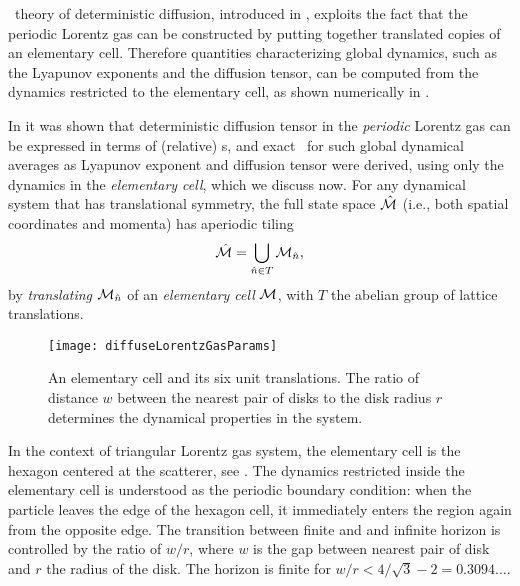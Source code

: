 

\Po\ theory of deterministic diffusion, introduced in
, exploits the fact that the periodic Lorentz
gas can be constructed by putting together translated copies of an
elementary cell. Therefore quantities characterizing global dynamics,
such as the Lyapunov exponents and the diffusion tensor, can be computed
from the dynamics restricted to the elementary cell, as shown numerically
in .

In  it was shown that
deterministic diffusion tensor in the {\em periodic} Lorentz gas can be
expressed in terms of (relative) \po s, and exact \cycForm\ for such
global dynamical averages as Lyapunov exponent and diffusion tensor were
derived, using only the dynamics in the \emph{elementary cell}, which we discuss now. For any
dynamical system that has translational symmetry, the full state space
$\hat {{\cal M}}$ (i.e., both spatial coordinates and momenta) has aperiodic tiling
\[ %
\hM=\bigcup_{ \hn \in T} \pS_{\hn},
\] %
by {\em translating} ${\cal M}_{\hat{n}}$ of an {\em elementary cell} ${\cal M}$, with
$T$ the abelian group of lattice translations.

\begin{figure}[htbp]
	\begin{center}
\texttt{[image: diffuseLorentzGasParams]}
	\end{center}
	\caption[]{\label{fig-LorentzGasParams}
		An elementary cell and its six unit translations. The ratio of
		distance $w$ between the nearest pair of disks to the    disk radius
		$r$ determines the dynamical properties in the system.
	}
\end{figure}

In the context of triangular Lorentz gas system, the elementary cell is the hexagon centered at the scatterer, see . The
dynamics restricted inside the elementary cell is understood as the periodic
boundary condition: when the particle leaves the edge of the hexagon cell, it
immediately enters the region again from the opposite edge. The transition between finite and and infinite horizon is controlled by the ratio of $w/r$, where $w$ is the gap between nearest pair of disk and $r$ the radius of the disk. The horizon is finite for $w/r < 4/\sqrt{3}-2 = 0.3094\dots$.

